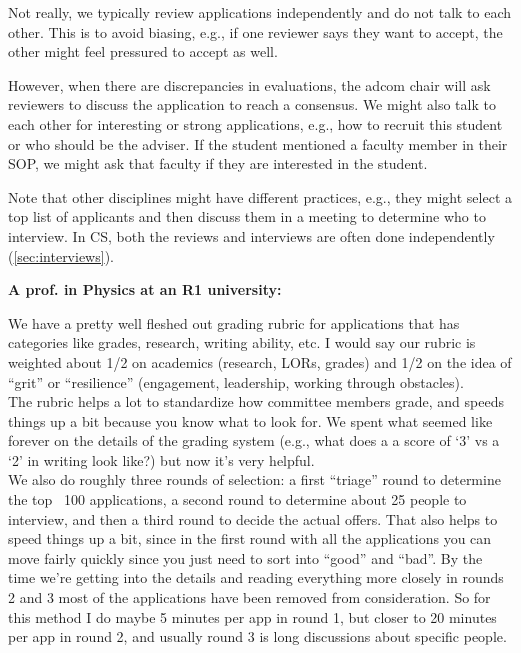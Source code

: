 \documentclass[oneside,11pt,dvipsnames]{book}
\newenvironment{commentbox}[1][]{
  \small
  \begin{mybox}
    {\small \textbf{#1}}
  }{
  \end{mybox}
}
\begin{document}
Not really, we typically review applications independently and do not talk to each other.  This is to avoid biasing, e.g., if one reviewer says they want to accept, the other might feel pressured to accept as well.  

However, when there are discrepancies in evaluations, the adcom chair will ask reviewers to discuss the application to reach a consensus.  We might also talk to each other for interesting or strong applications, e.g., how to recruit this student or who should be the adviser. 
If the student mentioned a faculty member in their SOP, we might ask that faculty if they are interested in the student. 


Note that other disciplines might have different practices, e.g., they might select a top list of applicants and then discuss them in a meeting to determine who to interview. In CS, both the reviews and interviews are often done independently (\autoref{sec:interviews}).

\begin{commentbox}[A prof. in Physics at an R1 university:]
  We have a pretty well fleshed out grading rubric for applications that has categories like grades, research, writing ability, etc. I would say our rubric is weighted about 1/2 on academics (research, LORs, grades) and 1/2 on the idea of ``grit'' or ``resilience'' (engagement, leadership, working through obstacles).\\

  
  The rubric helps a lot to standardize how committee members grade, and speeds things up a bit because you know what to look for. We spent what seemed like forever on the details of the grading system (e.g., what does a a score of `3' vs a `2' in writing look like?) but now it's very helpful.\\
  

  We also do roughly three rounds of selection: a first ``triage'' round to determine the top ~100 applications, a second round to determine about 25 people to interview, and then a third round to decide the actual offers. That also helps to speed things up a bit, since in the first round with all the applications you can move fairly quickly since you just need to sort into ``good'' and ``bad''. By the time we're getting into the details and reading everything more closely in rounds 2 and 3 most of the applications have been removed from consideration. So for this method I do maybe 5 minutes per app in round 1, but closer to 20 minutes per app in round 2, and usually round 3 is long discussions about specific people.   
\end{commentbox}
\end{document}
